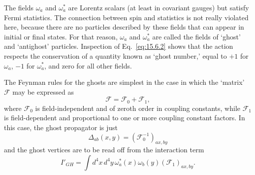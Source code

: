 The fields $\omega_a$ and $\omega_a^*$ are Lorentz scalars (at least
in covariant gauges) but satisfy Fermi statistics. The connection between spin
and statistics is not really violated here, because there are no particles
described by these fields that can appear in initial or final states. For that
reason, $\omega_a$ and $\omega_a^*$ are called the fields of `ghost'
and `antighost' particles. Inspection of Eq.~\eqref{eq:15.6.2} shows that the
action respects the conservation of a quantity known as `ghost number,' equal
to $+1$ for $\omega_a$, $-1$ for $\omega_a^*$, and zero for all other
fields.

The Feynman rules for the ghosts are simplest in the case in which the
`matrix' $\mathcal F$ may be expressed as
\begin{equation}
  \mathcal F=\mathcal F_0+\mathcal F_1,
  \tag{15.6.5}\label{eq:15.6.5}
\end{equation}
where $\mathcal F_0$ is field-independent and of zeroth order in coupling
constants, while $\mathcal F_1$ is field-dependent and proportional to one or
more coupling constant factors. In this case, the ghost propagator is just
\begin{equation}
  \Delta_{ab}(x,y)
  =(\mathcal F_0^{-1})_{a x,b y}
  \tag{15.6.6}\label{eq:15.6.6}
\end{equation}
and the ghost vertices are to be read off from the interaction term
\begin{equation}
  I'_{GH}=\int d^4x\,d^4y\,
  \omega_a^*(x)\omega_b(y)(\mathcal F_1)_{a x,b y}.
  \tag{15.6.7}\label{eq:15.6.7}
\end{equation}

